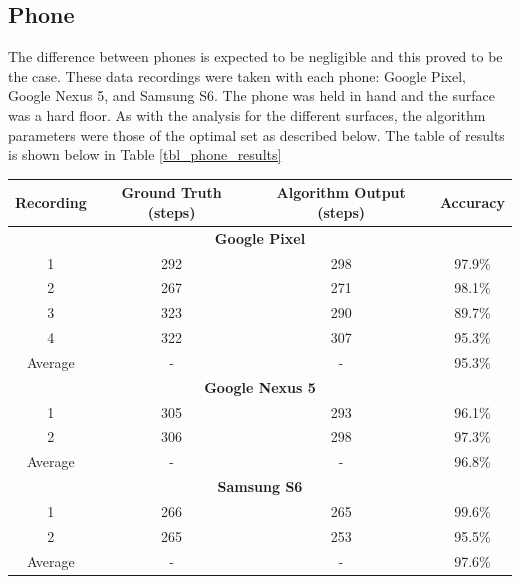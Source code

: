             \subsection{Phone}

                The difference between phones is expected to be negligible and this proved to be the case. These data recordings were taken with each phone: Google Pixel, Google Nexus 5, and Samsung S6. The phone was held in hand and the surface was a hard floor. As with the analysis for the different surfaces, the algorithm parameters were those of the optimal set as described below. The table of results is shown below in Table \ref{tbl_phone_results}

                \begin{center}
                    \label{tbl_phone_results}
                    \begin{tabular}{|c|c|c|c|}
                        \hline
                        Recording & Ground Truth (steps) & Algorithm Output (steps) & Accuracy \\
                        \hline
                        \multicolumn{4}{|c|}{\textbf{Google Pixel}} \\
                        \hline
                        1 & 292 & 298 & 97.9\% \\
                        2 & 267 & 271 & 98.1\% \\
                        3 & 323 & 290 & 89.7\% \\
                        4 & 322 & 307 & 95.3\% \\
                        \hline
                        Average & - & - & 95.3\% \\
                        \hline
                        \multicolumn{4}{|c|}{\textbf{Google Nexus 5}} \\                        
                        \hline
                        1 & 305 & 293 & 96.1\% \\
                        2 & 306 & 298 & 97.3\% \\
                        \hline
                        Average & - & - & 96.8\%\\
                        \hline
                        \multicolumn{4}{|c|}{\textbf{Samsung S6}} \\                        
                        \hline
                        1 & 266 & 265 & 99.6\% \\
                        2 & 265 & 253 & 95.5\% \\
                        \hline
                        Average & - & - & 97.6\% \\
                        \hline
                    \end{tabular}
                \end{center}

